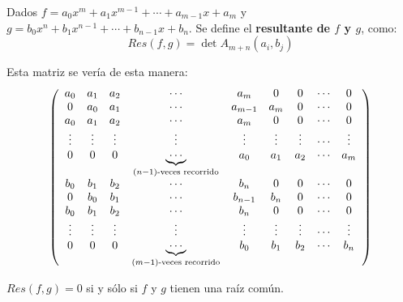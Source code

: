 \documentclass[12pt]{report}
\theoremstyle{largebreak}
\begin{document}
    \begin{mydef}
        Dados $f=a_0x^m+a_1x^{ m-1}+\cdots+a_{ m-1}x+a_m$ y $g=b_0x^n+b_1x^{ n-1}+\cdots+b_{ n-1}x+b_n$. Se define el \textbf{resultante de $f$ y $g$}, como:
        \begin{equation*}
            Res(f,g)=\det A_{ m+n}(a_i,b_j)
        \end{equation*}
    \end{mydef}

    Esta matriz se vería de esta manera:
    \begin{equation*}
        \left(
            \begin{array}{cccccccccc}
                a_0 & a_1 & a_2 & \cdots & a_m & 0 & 0 & \cdots & 0 \\
                0 & a_0 & a_1 &  \cdots & a_{ m-1} & a_m & 0 & \cdots & 0 \\
                a_0 & a_1 & a_2 & \cdots & a_m & 0 & 0 & \cdots & 0 \\
                \vdots & \vdots & \vdots & \vdots  & \vdots & \vdots & \vdots & \cdots & \vdots \\
                0 & 0 & 0 &  \underset{(n-1)\textup{-veces recorrido}}{\underbrace{\cdots}} & a_0 & a_1 & a_2 & \cdots & a_m \\
                b_0 & b_1 & b_2 & \cdots & b_n & 0 & 0 & \cdots & 0 \\
                0 & b_0 & b_1 &  \cdots & b_{ n-1} & b_n & 0 & \cdots & 0 \\
                b_0 & b_1 & b_2 & \cdots & b_n & 0 & 0 & \cdots & 0 \\
                \vdots & \vdots & \vdots & \vdots  & \vdots & \vdots & \vdots & \cdots & \vdots \\
                0 & 0 & 0 &  \underset{(m-1)\textup{-veces recorrido}}{\underbrace{\cdots}} & b_0 & b_1 & b_2 & \cdots & b_n \\
            \end{array}
         \right)
    \end{equation*}

    \begin{propo}
        $Res(f,g)=0$ si y sólo si $f$ y $g$ tienen una raíz común.
    \end{propo}
\end{document}
